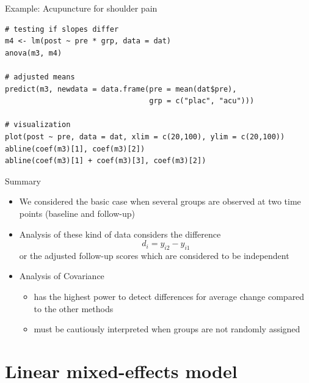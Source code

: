 \documentclass[aspectratio=169]{beamer}
\begin{document}
\begin{frame}[fragile]{Example: Acupuncture for shoulder pain}
\begin{lstlisting}
# testing if slopes differ
m4 <- lm(post ~ pre * grp, data = dat)
anova(m3, m4)

# adjusted means
predict(m3, newdata = data.frame(pre = mean(dat$pre),
                                 grp = c("plac", "acu")))

# visualization
plot(post ~ pre, data = dat, xlim = c(20,100), ylim = c(20,100))
abline(coef(m3)[1], coef(m3)[2])
abline(coef(m3)[1] + coef(m3)[3], coef(m3)[2])
\end{lstlisting}
\end{frame}

\begin{frame}[<+->]{Summary}
\begin{itemize}
  \item We considered the basic case when several groups are observed at
    two time points (baseline and follow-up)
  \item Analysis of these kind of data considers the difference
    \[
        d_i = y_{i2} - y_{i1}
    \]
    or the adjusted follow-up scores which are considered to be independent
  \item Analysis of Covariance
  \begin{itemize}
    \item has the highest power to detect differences for average change
      compared to the other methods
    \item must be cautiously interpreted when groups are not randomly
      assigned
  \end{itemize}
\end{itemize}
\end{frame}

\section{Linear mixed-effects model}
\end{document}
